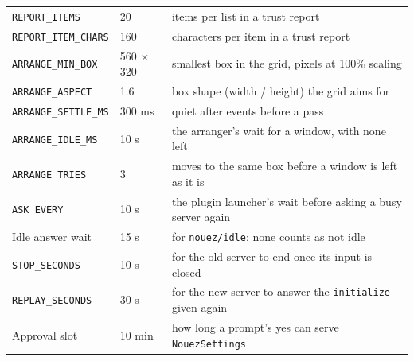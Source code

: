 \documentclass[10pt,a4paper]{article}
\newcommand{\code}[1]{\texttt{#1}}
\begin{document}
\begin{center}
\begin{tabular}{@{}l l l@{}}
\code{REPORT\_ITEMS} & 20 & items per list in a trust report \\
\code{REPORT\_ITEM\_CHARS} & 160 & characters per item in a trust report \\
\code{ARRANGE\_MIN\_BOX} & 560 $\times$ 320 & smallest box in the grid, pixels at 100\% scaling \\
\code{ARRANGE\_ASPECT} & 1.6 & box shape (width / height) the grid aims for \\
\code{ARRANGE\_SETTLE\_MS} & 300 ms & quiet after events before a pass \\
\code{ARRANGE\_IDLE\_MS} & 10 s & the arranger's wait for a window, with none left \\
\code{ARRANGE\_TRIES} & 3 & moves to the same box before a window is left as it is \\
\code{ASK\_EVERY} & 10 s & the plugin launcher's wait before asking a busy server again \\
Idle answer wait & 15 s & for \code{nouez/idle}; none counts as not idle \\
\code{STOP\_SECONDS} & 10 s & for the old server to end once its input is closed \\
\code{REPLAY\_SECONDS} & 30 s & for the new server to answer the \code{initialize} given again \\
Approval slot & 10 min & how long a prompt's yes can serve \code{NouezSettings} \\
\bottomrule
\end{tabular}
\end{center}
\end{document}
